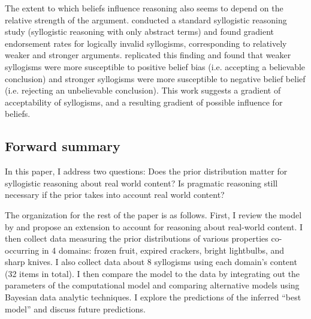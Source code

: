\documentclass{llncs} %
\begin{document}
The extent to which beliefs influence reasoning also seems to depend on the relative strength of the argument.  conducted a standard syllogistic reasoning study (syllogistic reasoning with only abstract terms) and found gradient endorsement rates for logically invalid syllogisms, corresponding to relatively weaker and stronger arguments.  replicated this finding and found that weaker syllogisms were more susceptible to positive belief bias (i.e. accepting a believable conclusion) and stronger syllogisms were more susceptible to negative belief belief (i.e. rejecting an unbelievable conclusion). This work suggests a gradient of acceptability of syllogisms, and a resulting gradient of possible influence for beliefs. 

\subsection{Forward summary}

In this paper, I address two questions: Does the prior distribution matter for syllogistic reasoning about real world content? Is pragmatic reasoning still necessary if the prior takes into account real world content? 

The organization for the rest of the paper is as follows. First, I review the model by  and propose an extension to account for reasoning about real-world content. I then collect data measuring the prior distributions of various properties co-occurring in 4 domains: frozen fruit, expired crackers, bright lightbulbs, and sharp knives. I also collect data about 8 syllogisms using each domain's content (32 items in total). I then compare the model to the data by integrating out the parameters of the computational model and comparing alternative models using Bayesian data analytic techniques. I explore the predictions of the inferred ``best model'' and discuss future predictions. 
\end{document}
